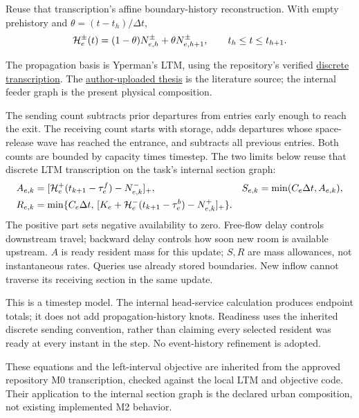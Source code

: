 \documentclass[10pt,a4paper]{article}
\newcommand{\pos}[1]{[#1]_+}
\newcommand{\rev}[1]{{\color{revisionred}#1}}
\begin{document}
\rev{Reuse that transcription's affine boundary-history reconstruction.}
With empty prehistory and $\theta=(t-t_h)/\Delta t$,
\begin{equation}
 {\cal H}^{\pm}_e(t)
 =(1-\theta)N^\pm_{e,h}+\theta N^\pm_{e,h+1},
 \qquad t_h\leq t\leq t_{h+1}.
 \label{eq:history}
\end{equation}

The propagation basis is Yperman's LTM, using the repository's verified
\href{../../../../docs/milestones/milestone_0_ltm_baseline.md}{discrete transcription}.
The \href{https://www.researchgate.net/publication/28360292_The_Link_Transmission_Model_for_dynamic_network_loading}{author-uploaded thesis}
is the literature source; the internal feeder graph is the present
physical composition.
\par

The sending count subtracts prior departures from entries early enough
to reach the exit. The receiving count starts with storage, adds departures
whose space-release wave has reached the entrance, and subtracts all
previous entries. Both counts are bounded by capacity times timestep.
\rev{The two limits below reuse that discrete LTM transcription on the task's internal section graph:}
\begin{align}
 A_{e,k}&=\pos{{\cal H}^+_e(t_{k+1}-\tau^f_e)-N^-_{e,k}},
 &S_{e,k}&=\min(C_e\Delta t,A_{e,k}),\label{eq:sending}\\
 R_{e,k}&=\min\{C_e\Delta t,\,
 \pos{K_e+{\cal H}^-_e(t_{k+1}-\tau^b_e)-N^+_{e,k}}\}.
 \label{eq:receiving}
\end{align}
The positive part sets negative availability to zero. Free-flow delay
controls downstream travel; backward delay controls how soon new room
is available upstream. $A$ is ready resident mass for this update;
$S,R$ are mass allowances,
not instantaneous rates. Queries use already stored boundaries.
New inflow cannot traverse its receiving section in the same update.

This is a timestep model. The internal head-service calculation produces
endpoint totals; it does not add propagation-history knots.
Readiness uses the inherited discrete sending convention, rather than
claiming every selected resident was ready at every instant in the step.
No event-history refinement is adopted.

These equations and the left-interval objective are inherited from the
approved repository M0 transcription, checked against the local LTM and
objective code. Their application to the internal section graph is the
declared urban composition, not existing implemented M2 behavior.
\end{document}
